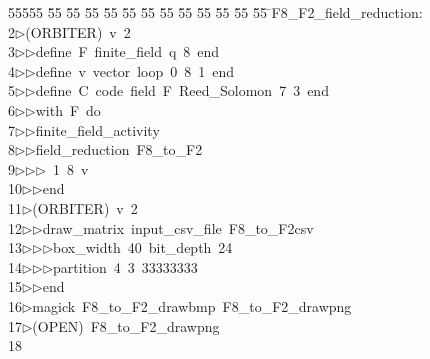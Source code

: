 %
%
\begin{tabbing}
55555 \= 55 \= 55 \= 55 \= 55 \= 55 \= 55 \= 55 \= 55 \= 55 \= 55 \= 55 \= 55 \= \>F8\_F2\_field\_reduction:\\[0pt]
2\>$\triangleright$\>(ORBITER)\ v\ 2\ \\[0pt]
3\>$\triangleright$\>$\triangleright$\>define\ F\ finite\_field\ q\ 8\ end\ \\[0pt]
4\>$\triangleright$\>$\triangleright$\>define\ v\ vector\ loop\ 0\ 8\ 1\ end\ \\[0pt]
5\>$\triangleright$\>$\triangleright$\>define\ C\ code\ field\ F\ Reed\_Solomon\ 7\ 3\ end\ \\[0pt]
6\>$\triangleright$\>$\triangleright$\>with\ F\ do\ \\[0pt]
7\>$\triangleright$\>$\triangleright$\>finite\_field\_activity\ \\[0pt]
8\>$\triangleright$\>$\triangleright$\>field\_reduction\ F8\_to\_F2\ \\[0pt]
9\>$\triangleright$\>$\triangleright$\>$\triangleright$\ 1\ 8\ v\ \\[0pt]
10\>$\triangleright$\>$\triangleright$\>end\\[0pt]
11\>$\triangleright$\>(ORBITER)\ v\ 2\ \\[0pt]
12\>$\triangleright$\>$\triangleright$\>draw\_matrix\ input\_csv\_file\ F8\_to\_F2csv\ \\[0pt]
13\>$\triangleright$\>$\triangleright$\>$\triangleright$\>box\_width\ 40\ bit\_depth\ 24\ \\[0pt]
14\>$\triangleright$\>$\triangleright$\>$\triangleright$\>partition\ 4\ 3\ 33333333\ \\[0pt]
15\>$\triangleright$\>$\triangleright$\>end\\[0pt]
16\>$\triangleright$\>magick\ F8\_to\_F2\_drawbmp\ F8\_to\_F2\_drawpng\\[0pt]
17\>$\triangleright$\>(OPEN)\ F8\_to\_F2\_drawpng\\[0pt]
18\>\end{tabbing}
